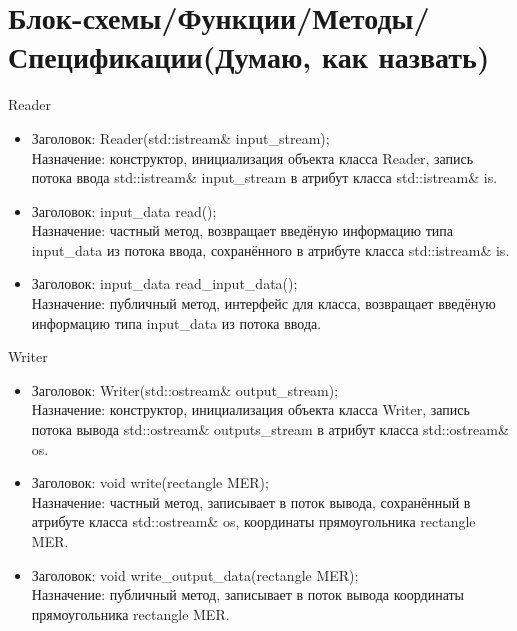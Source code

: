 \documentclass[12pt,a4paper]{article}
\begin{document}
\section{Блок-схемы/Функции/Методы/Спецификации(Думаю, как назвать)} {

\begin{center}
Reader
\end{center}
\begin{itemize}
\item Заголовок: Reader(std::istream\& input\_stream); \\
Назначение: конструктор, инициализация объекта класса Reader, запись потока ввода std::istream\& input\_stream в атрибут класса std::istream\& is.\\
\item Заголовок: input\_data read(); \\
Назначение: частный метод, возвращает введёную информацию типа input\_data из потока ввода, сохранённого в атрибуте класса std::istream\& is.\\
\item Заголовок: input\_data read\_input\_data(); \\
Назначение: публичный метод, интерфейс для класса, возвращает введёную информацию типа input\_data из потока ввода.\\
\end{itemize}

\begin{center}
Writer
\end{center}
\begin{itemize}
\item Заголовок: Writer(std::ostream\& output\_stream); \\
Назначение: конструктор, инициализация объекта класса Writer, запись потока вывода std::ostream\& outputs\_stream в атрибут класса std::ostream\& os.\\
\item Заголовок: void write(rectangle MER); \\
Назначение: частный метод, записывает в поток вывода, сохранённый в атрибуте класса std::ostream\& os, координаты прямоугольника rectangle MER.\\
\item Заголовок: void write\_output\_data(rectangle MER); \\
Назначение: публичный метод, записывает в поток вывода координаты прямоугольника rectangle MER.\\
\end{itemize}

}
\end{document}
